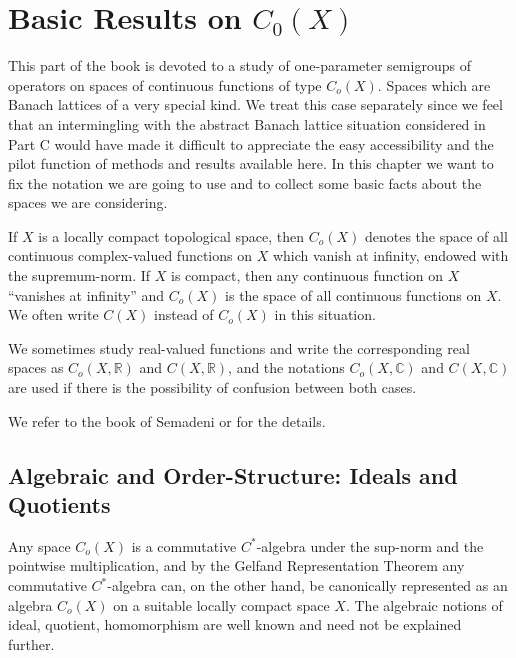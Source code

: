 
\chapter{Basic Results on $C_{0}(X)$}\label{chap:B-I}

This part of the book is devoted to a study of one-parameter semigroups of operators on spaces of continuous functions of type $C_{o}(X)$.
Spaces which are Banach lattices of a very special kind.
We treat this case separately since we feel that an intermingling with the abstract Banach lattice situation considered in Part C would have made it difficult to appreciate the easy accessibility and the pilot function of methods and results available here.
In this chapter we want to fix the notation we are going to use and to collect some basic facts about the spaces we are considering.

If $X$ is a locally compact topological space, then $C_{o}(X)$ denotes the space of all continuous complex-valued functions on $X$ which vanish at infinity, endowed with the supremum-norm.
If $X$ is compact, then any continuous function on $X$ \enquote{vanishes at infinity} and $C_{o}(X)$ is the space of all continuous functions on $X$.
We often write $C(X)$ instead of $C_{o}(X)$ in this situation.

We sometimes study real-valued functions and write the corresponding real spaces as $C_{o}(X,\mathbb{R})$ and $C(X,\mathbb{R})$, and the notations $C_{o}(X,\mathbb{C})$ and $C(X,\mathbb{C})$ are used if there is the possibility of confusion between both cases.

We refer to the book of Semadeni \cite{semadeni:1971} or \cite{folland:1999} for the details.

\section{Algebraic and Order-Structure: Ideals and Quotients}\label{sec:b1-1}

Any space $C_{o}(X)$ is a commutative $C^{*}$-algebra under the sup-norm and the pointwise multiplication, and by the Gelfand Representation Theorem any commutative $C^{*}$-algebra can, on the other hand, be canonically represented as an algebra $C_{o}(X)$ on a suitable locally compact space $X$.
The algebraic notions of ideal, quotient, homomorphism are
well known and need not be explained further.

